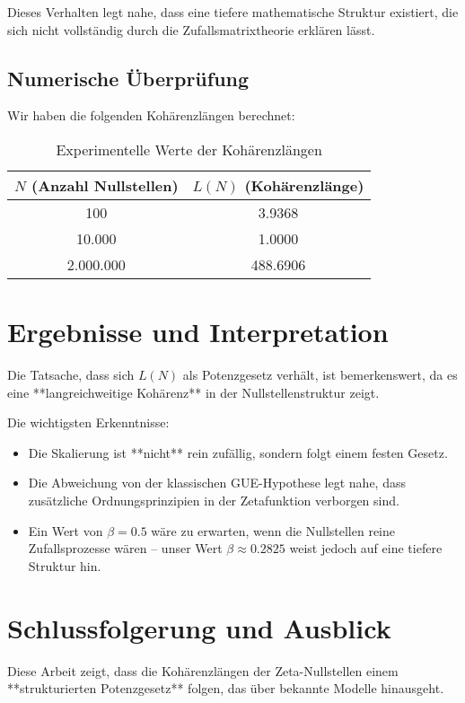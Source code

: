 \documentclass[a4paper,12pt]{article}
\begin{document}
Dieses Verhalten legt nahe, dass eine tiefere mathematische Struktur existiert, die sich nicht vollständig durch die Zufallsmatrixtheorie erklären lässt.

\subsection{Numerische Überprüfung}
Wir haben die folgenden Kohärenzlängen berechnet:

\begin{table}[h]
    \centering
    \begin{tabular}{c c}
        \toprule
        \( N \) (Anzahl Nullstellen) & \( L(N) \) (Kohärenzlänge) \\
        \midrule
        100 & 3.9368 \\
        10.000 & 1.0000 \\
        2.000.000 & 488.6906 \\
        \bottomrule
    \end{tabular}
    \caption{Experimentelle Werte der Kohärenzlängen}
    \label{tab:kohärenzlängen}
\end{table}

\section{Ergebnisse und Interpretation}
Die Tatsache, dass sich \( L(N) \) als Potenzgesetz verhält, ist bemerkenswert, da es eine **langreichweitige Kohärenz** in der Nullstellenstruktur zeigt.  

Die wichtigsten Erkenntnisse:
\begin{itemize}
    \item Die Skalierung ist **nicht** rein zufällig, sondern folgt einem festen Gesetz.
    \item Die Abweichung von der klassischen GUE-Hypothese legt nahe, dass zusätzliche Ordnungsprinzipien in der Zetafunktion verborgen sind.
    \item Ein Wert von \(\beta = 0.5\) wäre zu erwarten, wenn die Nullstellen reine Zufallsprozesse wären – unser Wert \(\beta \approx 0.2825\) weist jedoch auf eine tiefere Struktur hin.
\end{itemize}

\section{Schlussfolgerung und Ausblick}
Diese Arbeit zeigt, dass die Kohärenzlängen der Zeta-Nullstellen einem **strukturierten Potenzgesetz** folgen, das über bekannte Modelle hinausgeht.  
\end{document}
